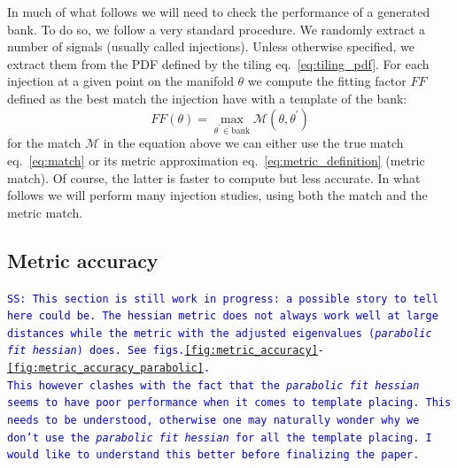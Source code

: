 \documentclass[twocolumn,showpacs,preprintnumbers,nofootinbib,prd,
superscriptaddress,10pt]{revtex4-2}
\newcommand{\stefano}[1]{{\textcolor{blue}{\texttt{SS: #1}} }}
\begin{document}
In much of what follows we will need to check the performance of a generated bank. To do so, we follow a very standard procedure. We randomly extract a number of signals (usually called injections). Unless otherwise specified, we extract them from the PDF defined by the tiling eq.~\eqref{eq:tiling_pdf}.
For each injection at a given point on the manifold $\theta$ we compute the fitting factor $FF$ defined as the best match the injection have with a template of the bank:
\begin{equation}\label{eq:FF}
	FF(\theta) = \max_{\theta^\prime \in \text{bank}} \mathcal{M}(\theta, \theta^\prime)
\end{equation}
for the match $\mathcal{M}$ in the equation above we can either use the true match eq.~\eqref{eq:match} or its metric approximation eq.~\eqref{eq:metric_definition} (metric match).
Of course, the latter is faster to compute but less accurate. In what follows we will perform many injection studies, using both the match and the metric match.

\subsection{Metric accuracy} \label{sec:metric_accuracy}

\stefano{This section is still work in progress: a possible story to tell here could be. The hessian metric does not always work well at large distances while the metric with the adjusted eigenvalues ({\it parabolic fit hessian}) does. See figs.\ref{fig:metric_accuracy}-\ref{fig:metric_accuracy_parabolic}.\\
This however clashes with the fact that the {\it parabolic fit hessian} seems to have poor performance when it comes to template placing. This needs to be understood, otherwise one may naturally wonder why we don't use the {\it parabolic fit hessian} for all the template placing. I would like to understand this better before finalizing the paper.
}
\end{document}
